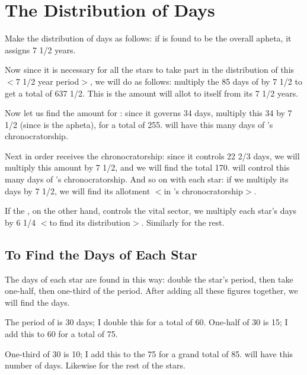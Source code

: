 \section{The Distribution of Days}

Make the distribution of days as follows: if \Saturn\xspace is found to be the overall apheta, it assigns 7 1/2 years.

Now since it is necessary for all the stars to take part in the distribution of this $<$7 1/2 year period$>$, we will do as follows: multiply the 85 days of \Saturn\xspace by 7 1/2 to get a total of 637 1/2. This is the amount \Saturn\xspace will allot to itself from its 7 1/2 years. 

Now let us find the amount for \Jupiter: since it governs 34 days, multiply this 34 by 7 1/2 (since \Saturn\xspace is the apheta), for a total of 255. \Jupiter\xspace will have this many days of \Saturn’s chronocratorship. 

Next in order \Venus\xspace receives the chronocratorship: since
it controls 22 2/3 days, we will multiply this amount by 7 1/2, and we will find the total 170. \Venus\xspace will control this many days of \Saturn’s chronocratorship. And so on with each star: if we multiply its days by 7 1/2, we will find its allotment $<$in \Saturn’s chronocratorship$>$. 

If the \Moon, on the other hand, controls the vital sector, we multiply each star’s days by 6 1/4 $<$to find its distribution$>$. Similarly for the rest.

\subsection{To Find the Days of Each Star}

The days of each star are found in this way: double the star’s period, then take one-half, then one-third of the period. 
After adding all these figures together, we will find the days. 

The period of \Saturn\xspace is 30 days; I double this for a total of 60. One-half of 30 is 15; I add this to 60 for a total of 75. 

One-third of 30 is 10; I add this to the 75 for a grand total of 85. \Saturn\xspace will have this number of days. Likewise for the rest of the stars.

\newpage